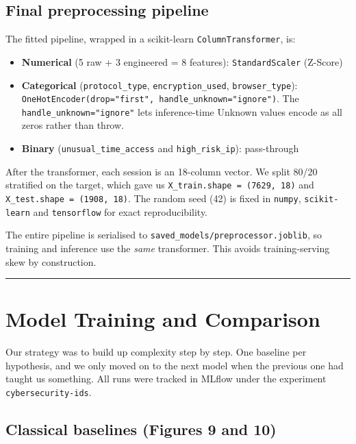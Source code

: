 \subsection{Final preprocessing
pipeline}\label{final-preprocessing-pipeline}

The fitted pipeline, wrapped in a scikit-learn
\texttt{ColumnTransformer}, is:

\begin{itemize}
\tightlist
\item
  \textbf{Numerical} (5 raw + 3 engineered = 8 features):
  \texttt{StandardScaler} (Z-Score)
\item
  \textbf{Categorical} (\texttt{protocol\_type},
  \texttt{encryption\_used}, \texttt{browser\_type}):
  \texttt{OneHotEncoder(drop="first",\ handle\_unknown="ignore")}. The
  \texttt{handle\_unknown="ignore"} lets inference-time Unknown values
  encode as all zeros rather than throw.
\item
  \textbf{Binary} (\texttt{unusual\_time\_access} and
  \texttt{high\_risk\_ip}): pass-through
\end{itemize}

After the transformer, each session is an 18-column vector. We split
80/20 stratified on the target, which gave us
\texttt{X\_train.shape\ =\ (7629,\ 18)} and
\texttt{X\_test.shape\ =\ (1908,\ 18)}. The random seed (42) is fixed in
\texttt{numpy}, \texttt{scikit-learn} and \texttt{tensorflow} for exact
reproducibility.

The entire pipeline is serialised to
\texttt{saved\_models/preprocessor.joblib}, so training and inference
use the \emph{same} transformer. This avoids training-serving skew by
construction.

\begin{center}\rule{0.5\linewidth}{0.5pt}\end{center}

\section{Model Training and
Comparison}\label{model-training-and-comparison}

Our strategy was to build up complexity step by step. One baseline per
hypothesis, and we only moved on to the next model when the previous one
had taught us something. All runs were tracked in MLflow under the
experiment \texttt{cybersecurity-ids}.

\subsection{Classical baselines (Figures 9 and
10)}\label{classical-baselines-figures-9-and-10}

